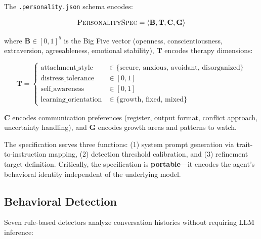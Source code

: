 \documentclass[11pt,a4paper]{article}
\begin{document}
The \texttt{.personality.json} schema encodes:

\begin{equation}
\textsc{PersonalitySpec} = \langle \mathbf{B}, \mathbf{T}, \mathbf{C}, \mathbf{G} \rangle
\end{equation}

\noindent where $\mathbf{B} \in [0,1]^5$ is the Big Five vector (openness, conscientiousness, extraversion, agreeableness, emotional stability), $\mathbf{T}$ encodes therapy dimensions:

\begin{equation}
\mathbf{T} = \begin{cases}
\text{attachment\_style} &\in \{\text{secure, anxious, avoidant, disorganized}\} \\
\text{distress\_tolerance} &\in [0,1] \\
\text{self\_awareness} &\in [0,1] \\
\text{learning\_orientation} &\in \{\text{growth, fixed, mixed}\}
\end{cases}
\end{equation}

\noindent $\mathbf{C}$ encodes communication preferences (register, output format, conflict approach, uncertainty handling), and $\mathbf{G}$ encodes growth areas and patterns to watch.

The specification serves three functions: (1) system prompt generation via trait-to-instruction mapping, (2) detection threshold calibration, and (3) refinement target definition. Critically, the specification is \textbf{portable}---it encodes the agent's behavioral identity independent of the underlying model.

\subsection{Behavioral Detection}

Seven rule-based detectors analyze conversation histories without requiring LLM inference:
\end{document}
